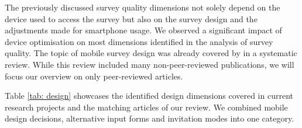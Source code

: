 The previously discussed survey quality dimensions not solely depend on the device used to access the survey but also on the survey design and the adjustments made for smartphone usage. We observed a significant impact of device optimisation on most dimensions identified in the analysis of survey quality. The topic of mobile survey design was already covered by \cite{antoun_design_2018} in a systematic review. While this review included many non-peer-reviewed publications, we will focus our overview on only peer-reviewed articles. 

Table \ref{tab: design} showcases the identified design dimensions covered in current research projects and the matching articles of our review. We combined mobile design decisions, alternative input forms and invitation modes into one category. 

